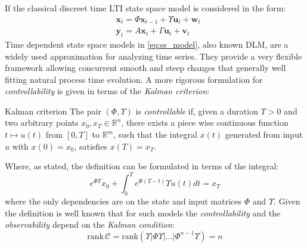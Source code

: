 If the classical discreet time \acl{LTI} state space model is considered in the form:
\begin{align}
    & \bm{x}_t = \Phi\bm{x}_{t-1} + \Upsilon\bm{u}_t + \bm{w}_t\\
    & \bm{y}_t = A\bm{x}_t + \Gamma\bm{u}_t + \bm{v}_t
    \label{eq:ss_model}
\end{align}
Time dependent state space models in \eqref{eq:ss_model}, also known \acl{DLM}, are a widely used approximation for analyzing time series. They provide a very flexible framework allowing concurrent smooth and steep changes that generally well fitting natural process time evolution.
A more rigorous formulation for \textit{controllability} is given in terms of the \textit{Kalman criterion}:
\begin{definition}{Kalman criterion}
The pair $(\Phi,\Upsilon)$ is \textit{controllable} if, given a duration $T>0$ and two arbitrary points $x_0, x_T \in \mathbb{R}^n$, there exists a piece wise continuous function $t \mapsto u(t)$ from $[0,T]$ to $\mathbb{R}^m$, such that the integral $x(t)$ generated from input $u$ with $x(0) = x_0$, satisfies $x(T)=x_T$.
\end{definition}
Where, as stated, the definition can be formulated in terms of the integral:
\begin{equation}
    e^{\Phi T}x_0 + \int_0^T e^{\Phi(T-t)}\Upsilon u(t) dt = x_T
\end{equation}
where the only dependencies are on the state and input matrices $\Phi$ and $\Upsilon$.
Given the definition is well known that for such models the \textit{controllability} and the \textit{observability} depend on the \textit{Kalman condition}:
\begin{equation}
    \mathrm{rank}\,\mathscr{C} = \mathrm{rank}\left( \Upsilon|\Phi\Upsilon|...|\Phi^{n-1}\Upsilon \right) = n
\end{equation}




